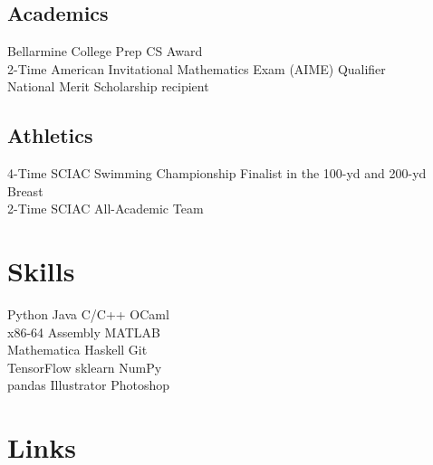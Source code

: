 \documentclass[]{deedy-resume-openfont}
\begin{document}
\begin{minipage}[t]{0.33\textwidth}
\sectionsep
\subsection{Academics}
\textbullet{} Bellarmine College Prep CS Award \\
\textbullet{} 2-Time American Invitational Mathematics Exam (AIME) Qualifier \\
\textbullet{} National Merit Scholarship recipient \\

\sectionsep
\subsection{Athletics}
\textbullet{} 4-Time SCIAC Swimming Championship Finalist in the 100-yd and 200-yd Breast \\
\textbullet{} 2-Time SCIAC All-Academic Team

\sectionsep

\section{Skills}
\textbullet{}  Python \textbullet{} Java \textbullet{} C/C++ \textbullet{} OCaml \textbullet{} \\
\textbullet{}  x86-64 Assembly \textbullet{} MATLAB \textbullet{} \\ 
\textbullet{} Mathematica \textbullet{} Haskell \textbullet{} Git \textbullet{} \\
\textbullet{} TensorFlow \textbullet{} sklearn \textbullet{} NumPy \textbullet{} \\
\textbullet{} pandas \textbullet{} Illustrator \textbullet{} Photoshop \textbullet{} \\
\sectionsep

\section{Links} 




%
%

\end{minipage} 
\end{document}
